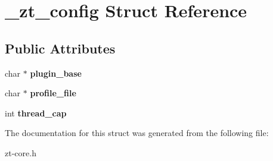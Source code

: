 \hypertarget{struct__zt__config}{\section{\-\_\-zt\-\_\-config Struct Reference}
\label{struct__zt__config}
}
\subsection*{Public Attributes}
\begin{DoxyCompactItemize}
\item 
\hypertarget{struct__zt__config_a0f38952e088fcc5a420eca1129d9e987}{char $\ast$ {\bfseries plugin\-\_\-base}}\label{struct__zt__config_a0f38952e088fcc5a420eca1129d9e987}

\item 
\hypertarget{struct__zt__config_ad2dd493b99452abca2dc5739561927ae}{char $\ast$ {\bfseries profile\-\_\-file}}\label{struct__zt__config_ad2dd493b99452abca2dc5739561927ae}

\item 
\hypertarget{struct__zt__config_ad2caff766a546fc91dfdfe477c16ebdb}{int {\bfseries thread\-\_\-cap}}\label{struct__zt__config_ad2caff766a546fc91dfdfe477c16ebdb}

\end{DoxyCompactItemize}


The documentation for this struct was generated from the following file\-:\begin{DoxyCompactItemize}
\item 
zt-\/core.\-h\end{DoxyCompactItemize}
